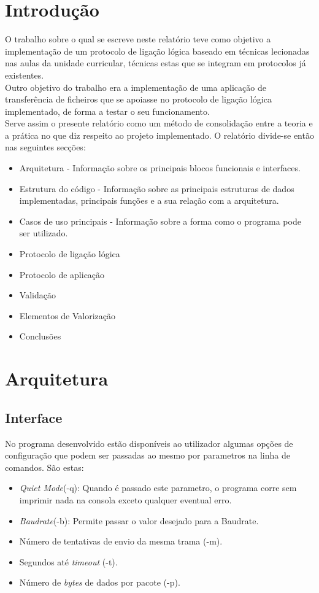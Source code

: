 \documentclass{article}
\begin{document}
\section{Introdução}
O trabalho sobre o qual se escreve neste relatório teve como objetivo a implementação de um protocolo de ligação lógica baseado em técnicas lecionadas nas aulas da unidade curricular, técnicas estas que se integram em protocolos já existentes.\\
Outro objetivo do trabalho era a implementação de uma aplicação de transferência de ficheiros que se apoiasse no protocolo de ligação lógica implementado, de forma a testar o seu funcionamento.\\
Serve assim o presente relatório como um método de consolidação entre a teoria e a prática no que diz respeito ao projeto implementado. O relatório divide-se então nas seguintes secções: 

\begin{itemize}
    \item Arquitetura - Informação sobre os principais blocos funcionais e interfaces.
    \item Estrutura do código - Informação sobre as principais estruturas de dados implementadas, principais funções e a sua relação com a arquitetura.
    \item Casos de uso principais - Informação sobre a forma como o programa pode ser utilizado.
    \item Protocolo de ligação lógica
    \item Protocolo de aplicação
    \item Validação
    \item Elementos de Valorização
    \item Conclusões
\end{itemize}

\section{Arquitetura}
\subsection{Interface}
No programa desenvolvido estão disponíveis ao utilizador algumas opções de configuração que podem ser passadas ao mesmo por parametros na linha de comandos. São estas:\\
\begin{itemize}
   \item \textit{Quiet Mode}(-q): Quando é passado este parametro, o programa corre sem imprimir nada na consola exceto qualquer eventual erro.%
   \item \textit{Baudrate}(-b): Permite passar o valor desejado para a Baudrate.
   \item Número de tentativas de envio da mesma trama (-m).
   \item Segundos até \textit{timeout} (-t).
   \item Número de \textit{bytes} de dados por pacote (-p).
\end{itemize}
\end{document}
